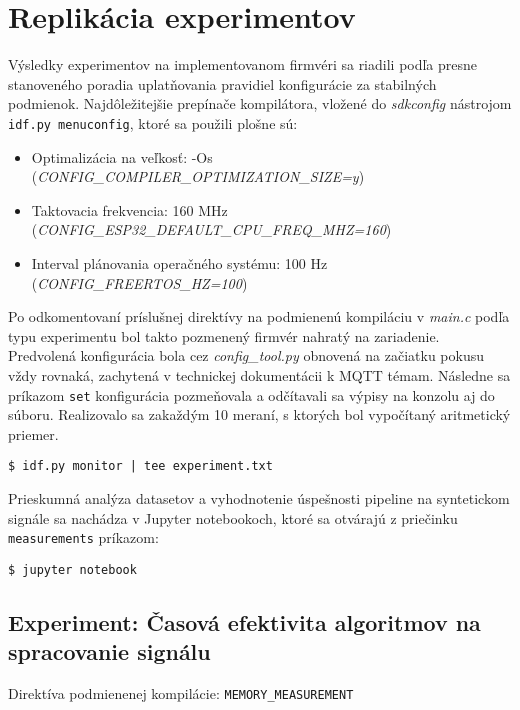 \section{Replikácia experimentov}
Výsledky experimentov na implementovanom firmvéri sa riadili podľa presne stanoveného poradia
uplatňovania pravidiel konfigurácie za stabilných podmienok. Najdôležitejšie
prepínače kompilátora, vložené do \emph{sdkconfig} nástrojom \verb|idf.py menuconfig|, ktoré 
sa použili plošne sú:
\begin{itemize}[noitemsep,topsep=0pt]
    \item Optimalizácia na veľkosť: -Os \\(\emph{CONFIG\_COMPILER\_OPTIMIZATION\_SIZE=y})
   	\item Taktovacia frekvencia: 160 MHz  \\ (\emph{CONFIG\_ESP32\_DEFAULT\_CPU\_FREQ\_MHZ=160})
    \item Interval plánovania operačného systému: 100 Hz\\  (\emph{CONFIG\_FREERTOS\_HZ=100})
\end{itemize}
    
Po odkomentovaní príslušnej direktívy na podmienenú kompiláciu v \emph{main.c} podľa typu experimentu
bol takto pozmenený firmvér nahratý na zariadenie. Predvolená konfigurácia bola
cez \emph{config\_tool.py} obnovená na začiatku pokusu vždy rovnaká, zachytená v technickej dokumentácii
k MQTT témam. Následne sa príkazom \verb|set| konfigurácia pozmeňovala a odčítavali
sa výpisy na konzolu aj do súboru. Realizovalo sa zakaždým 10 meraní, s ktorých bol vypočítaný aritmetický priemer.
\begin{lstlisting}[style=messages]
$ idf.py monitor | tee experiment.txt
\end{lstlisting}
\bigbreak

Prieskumná analýza datasetov a vyhodnotenie úspešnosti pipeline na syntetickom signále
sa nachádza v Jupyter notebookoch, ktoré sa otvárajú z priečinku \verb|measurements| príkazom:
\begin{lstlisting}[style=messages]
$ jupyter notebook
\end{lstlisting}


\subsection*{Experiment: Časová efektivita algoritmov na spracovanie signálu}
Direktíva podmienenej kompilácie: \verb|MEMORY_MEASUREMENT|

